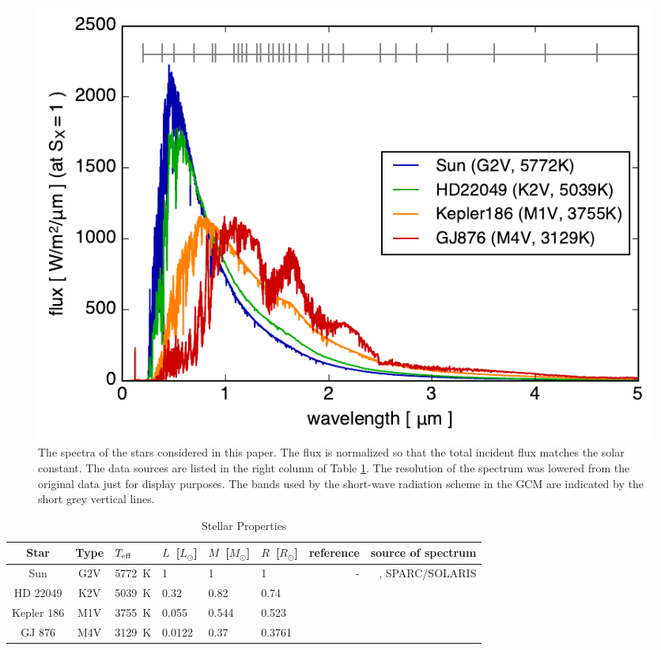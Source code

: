 \documentclass[11pt,numberedappendix,twocolappendix,]{emulateapj}
\begin{document}
\begin{figure}[!bh]
    \begin{center}
    \includegraphics[width=\hsize]{fig/star_spectra.pdf}
    \end{center}
\caption{The spectra of the stars considered in this paper. The flux is normalized so that the total incident flux matches the solar constant. The data sources are listed in the right column of Table \ref{tbl:stellar_properties}. The resolution of the spectrum was lowered from the original data just for display purposes. The bands used by the short-wave radiation scheme in the GCM are indicated by the short grey vertical lines.}
\label{fig:star_spectra}
\end{figure}



\begin{table}[btp]
\caption{Stellar Properties}
\begin{center}
\begin{tabular}{ccllllrr} \hline \hline
%
Star & Type & $T_{\rm eff}$ & $L$~[$L_{\odot}$] & $M$~[$M_{\odot}$] & $R$~[$R_{\odot}$] & reference & source of spectrum \\ \hline
%
Sun & G2V & 5772~K & 1 & 1 & 1 & - & \citet{Lean2005}, SPARC/SOLARIS\footnotemark[1] \\ 
%
HD 22049 & K2V & 5039~K & 0.32 & 0.82 & 0.74 & \citet{Baines2012} & \citet{Segura2003} \\
%
Kepler 186 & M1V & 3755~K & 0.055 & 0.544 & 0.523 & \citet{Torres2015} & \citet{Allard2012} \\
%
GJ 876 & M4V & 3129~K & 0.0122 & 0.37 & 0.3761 & \citet{vonBraun2014} & \citet{Domagal-Goldman2014} \\ \hline
\end{tabular}
\end{center}
\label{tbl:stellar_properties}
\end{table}%
\end{document}
